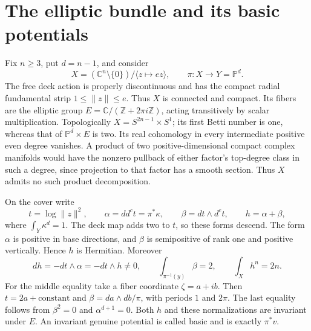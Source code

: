 \documentclass[11pt]{article}
\newcommand{\ddc}{dd^c}
\newcommand{\PP}{\mathbb P}
\theoremstyle{remark}\newtheorem{remark}[theorem]{Remark}
\begin{document}
\section{The elliptic bundle and its basic potentials}
Fix $n\geq3$, put $d=n-1$, and consider
\[
 X=(\mathbb C^n\setminus\{0\})/\langle z\mapsto ez\rangle,
 \qquad \pi:X\longrightarrow Y=\PP^d.
\]
The free deck action is properly discontinuous and has the compact radial
fundamental strip $1\leq\lVert z\rVert\leq e$. Thus $X$ is connected and
compact. Its fibers are the elliptic group
$E=\mathbb C/(\mathbb Z+2\pi i\mathbb Z)$, acting transitively by
scalar multiplication. Topologically $X=S^{2n-1}\times S^1$; its first
Betti number is one, whereas that of $\PP^d\times E$ is two.
Its real cohomology in every intermediate positive even degree vanishes.
A product of two positive-dimensional compact complex manifolds would
have the nonzero pullback of either factor's top-degree class in such
a degree, since projection to that factor has a smooth section.
Thus $X$ admits no such product decomposition.

On the cover write
\[
 t=\log\lVert z\rVert^2,\qquad
 \alpha=\ddc t=\pi^*\kappa,\qquad
 \beta=dt\wedge d^ct,\qquad h=\alpha+\beta,
\]
where $\int_Y\kappa^d=1$. The deck map adds two to $t$, so these
forms descend. The form $\alpha$ is positive in base directions, and
$\beta$ is semipositive of rank one and positive vertically. Hence $h$
is Hermitian. Moreover
\begin{equation}\label{eq:geometry}
 dh=-dt\wedge\alpha=-dt\wedge h\ne0,
 \qquad \int_{\pi^{-1}(y)}\beta=2,
 \qquad \int_Xh^n=2n.
\end{equation}
For the middle equality take a fiber coordinate $\zeta=a+ib$. Then
$t=2a+\text{constant}$ and $\beta=da\wedge db/\pi$, with periods
$1$ and $2\pi$. The last equality follows from $\beta^2=0$ and
$\alpha^{d+1}=0$. Both $h$ and these normalizations are invariant under
$E$. An invariant genuine potential is called basic and is exactly $\pi^*v$.
\end{document}
